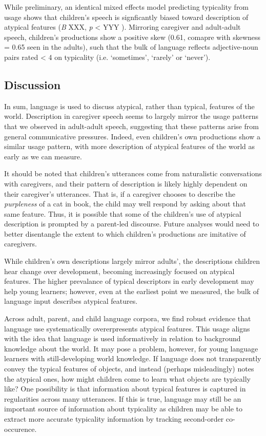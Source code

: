 \documentclass[10pt, letterpaper]{article}
\begin{document}
While preliminary, an identical mixed effects model predicting
typicality from usage shows that children's speech is signficantly
biased toward description of atypical features (\emph{B} XXX, \emph{p}
\textless{} YYY ). Mirroring caregiver and adult-adult speech,
children's productions show a positive skew (0.61, comapre with skewness
= 0.65 seen in the adults), such that the bulk of language reflects
adjective-noun pairs rated \textless{} 4 on typicality (i.e.
`sometimes', `rarely' or `never').

\hypertarget{discussion}{%
\subsection{Discussion}\label{discussion}}

In sum, language is used to discuss atypical, rather than typical,
features of the world. Description in caregiver speech seems to largely
mirror the usage patterns that we observed in adult-adult speech,
suggesting that these patterns arise from general communicative
pressures. Indeed, even children's own productions show a similar usage
pattern, with more description of atypical features of the world as
early as we can measure.

It should be noted that children's utterances come from naturalistic
conversations with caregivers, and their pattern of description is
likely highly dependent on their caregiver's utterances. That is, if a
caregiver chooses to describe the \emph{purpleness} of a cat in book,
the child may well respond by asking about that same feature. Thus, it
is possible that some of the children's use of atypical description is
prompted by a parent-led discourse. Future analyses would need to better
disentangle the extent to which children's productions are imitative of
caregivers.

While children's own descriptions largely mirror adults', the
descriptions children hear change over development, becoming
increasingly focused on atypical features. The higher prevalance of
typical descriptors in early development may help young learners;
however, even at the earliest point we measured, the bulk of language
input describes atypical features.

Across adult, parent, and child language corpora, we find robust
evidence that language use systematically overerpresents atypical
features. This usage aligns with the idea that language is used
informatively in relation to background knowledge about the world. It
may pose a problem, however, for young language learners with
still-developing world knowledge. If language does not transparently
convey the typical features of objects, and instead (perhaps
misleadingly) notes the atypical ones, how might children come to learn
what objects are typically like? One possibility is that information
about typical features is captured in regularities across many
utterances. If this is true, language may still be an important source
of information about typicality as children may be able to extract more
accurate typicality information by tracking second-order co-occurence.
\end{document}
